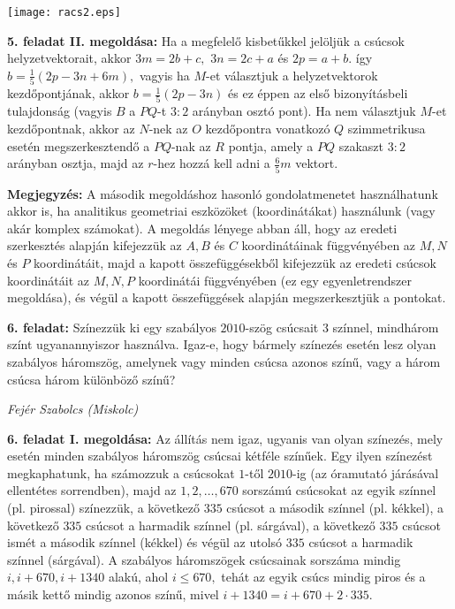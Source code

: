 \documentclass[a4paper,10pt]{article}
\def\ki#1#2{\hfill {\it #1 (#2)}\medskip}
\begin{document}
\centerline{\texttt{[image: racs2.eps]}}

\medskip

{\bf 5. feladat II. megoldása: } Ha a megfelelő kisbetűkkel jelöljük a
csúcsok helyzetvektorait, akkor $3m=2b+c,$ $3n=2c+a$ és
$2p=a+b.$ így $b=\frac 15 (2p-3n+6m),$ vagyis ha $M$-et
választjuk a helyzetvektorok kezdőpontjának, akkor
$b=\frac{1}{5}(2p-3n)$ és ez éppen az első bizonyításbeli
tulajdonság (vagyis $B$ a $PQ$-t $3:2$ arányban osztó pont).
 Ha nem választjuk $M$-et
kezdőpontnak, akkor az $N$-nek az $O$ kezdőpontra vonatkozó
$Q$ szimmetrikusa esetén megszerkesztendő a $PQ$-nak az $R$
pontja, amely a $PQ$ szakaszt $3:2$ arányban osztja, majd az
$r$-hez hozzá kell adni a $\frac 65m$ vektort.

\medskip



\textbf{Megjegyzés: } A második megoldáshoz hasonló
gondolatme\-ne\-tet használhatunk akkor is, ha ana\-litikus
geometriai eszközöket (koordinátákat) használunk (vagy
akár komplex számokat). A megoldás lényege abban áll, hogy
az eredeti szerkesztés alapján kifejezzük az $A,B$ és $C$
koordinátáinak függ\-vényében az $M,N$ és $P$
koordinátáit, majd a kapott összefüggésekből
kifejezzük az eredeti csúcsok koordinátáit az $M,N,P$
koordinátái függvényében (ez egy egyenletrendszer
megoldása), és végül a kapott összefüggések alapján
megszerkesztjük a pontokat.


\medskip
{\bf 6. feladat: } Színezzük ki egy szabályos $2010$-szög csú\-csait $3$ színnel,
mindhárom színt ugyanannyiszor használva.  Igaz-e, hogy bár\-mely
színezés esetén lesz olyan szabályos háromszög, amelynek vagy minden
csúcsa azonos színű,  vagy a három csúcsa három különböző
színű?

\ki{Fejér Szabolcs}{Miskolc}\medskip

{\bf 6. feladat I. megoldása: } Az állítás nem igaz, ugyanis van olyan színezés, mely esetén minden
szabályos háromszög csúcsai kétféle színűek. Egy ilyen színezést
megkaphatunk, ha számozzuk a csúcsokat $1$-től $2010$-ig (az
óramutató járásával ellentétes sorrendben), majd az
$1,2,\ldots,670$ sorszámú csúcsokat az egyik színnel (pl.
pi\-ros\-sal) színezzük, a következő $335$ csúcsot a második
színnel (pl. kékkel), a következő $335$ csúcsot a harmadik
színnel (pl. sárgával), a következő $335$ csúcsot ismét
a második színnel (kékkel) és végül az utolsó $335$
csúcsot a harmadik színnel (sárgával). A szabályos háromszögek
csúcsainak sorszáma mindig $i,i+670,i+1340$ alakú, ahol  $i\leq
670,$ tehát az egyik csúcs mindig piros és a másik kettő
mindig azonos színű, mivel $i+1340=i+670+2 \cdot 335.$
\end{document}
